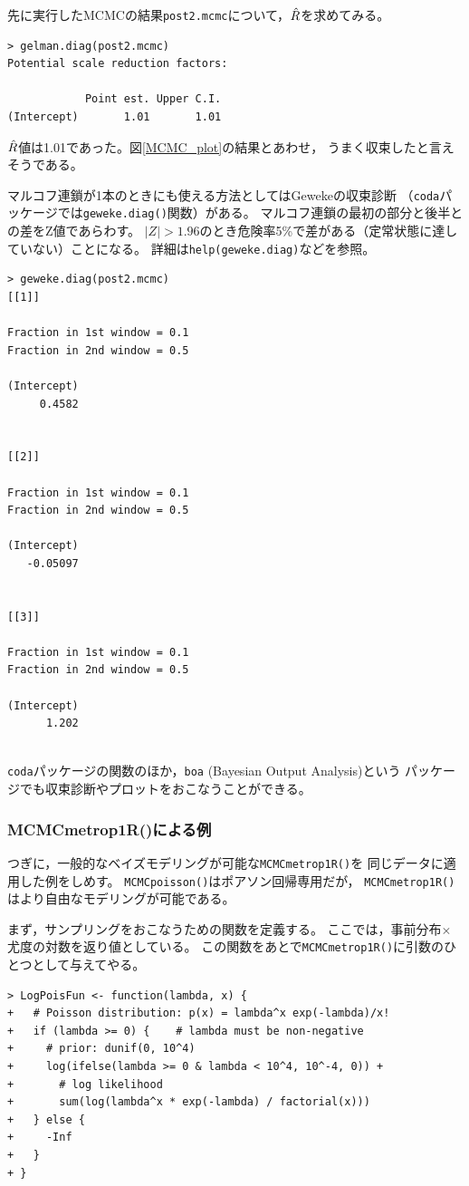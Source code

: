 \documentclass[11pt,uplatex]{jsarticle}
\begin{document}
先に実行したMCMCの結果\texttt{post2.mcmc}について，$\Hat{R}$を求めてみる。
\begin{lstlisting}
> gelman.diag(post2.mcmc)
Potential scale reduction factors:

            Point est. Upper C.I.
(Intercept)       1.01       1.01

\end{lstlisting}
$\Hat{R}$値は1.01であった。図\ref{MCMC_plot}の結果とあわせ，
うまく収束したと言えそうである。

\vspace{1zw}

マルコフ連鎖が1本のときにも使える方法としてはGewekeの収束診断
（\texttt{coda}パッケージでは\texttt{geweke.diag()}関数）がある。
マルコフ連鎖の最初の部分と後半との差をZ値であらわす。
$|Z|>1.96$のとき危険率5\%で差がある（定常状態に達していない）ことになる。
詳細は\texttt{help(geweke.diag)}などを参照。
\begin{lstlisting}
> geweke.diag(post2.mcmc)
[[1]]

Fraction in 1st window = 0.1
Fraction in 2nd window = 0.5 

(Intercept) 
     0.4582 


[[2]]

Fraction in 1st window = 0.1
Fraction in 2nd window = 0.5 

(Intercept) 
   -0.05097 


[[3]]

Fraction in 1st window = 0.1
Fraction in 2nd window = 0.5 

(Intercept) 
      1.202 


\end{lstlisting}

\texttt{coda}パッケージの関数のほか，\texttt{boa} (Bayesian Output Analysis)という
パッケージでも収束診断やプロットをおこなうことができる。

\subsubsection{MCMCmetrop1R()による例}

つぎに，一般的なベイズモデリングが可能な\texttt{MCMCmetrop1R()}を
同じデータに適用した例をしめす。
\texttt{MCMCpoisson()}はポアソン回帰専用だが，
\texttt{MCMCmetrop1R()}はより自由なモデリングが可能である。

まず，サンプリングをおこなうための関数を定義する。
ここでは，事前分布$\times$尤度の対数を返り値としている。
この関数をあとで\texttt{MCMCmetrop1R()}に引数のひとつとして与えてやる。
\begin{lstlisting}
> LogPoisFun <- function(lambda, x) {
+   # Poisson distribution: p(x) = lambda^x exp(-lambda)/x!
+   if (lambda >= 0) {    # lambda must be non-negative
+     # prior: dunif(0, 10^4)
+     log(ifelse(lambda >= 0 & lambda < 10^4, 10^-4, 0)) + 
+       # log likelihood
+       sum(log(lambda^x * exp(-lambda) / factorial(x)))
+   } else {
+     -Inf
+   }
+ }
\end{lstlisting}
\end{document}
